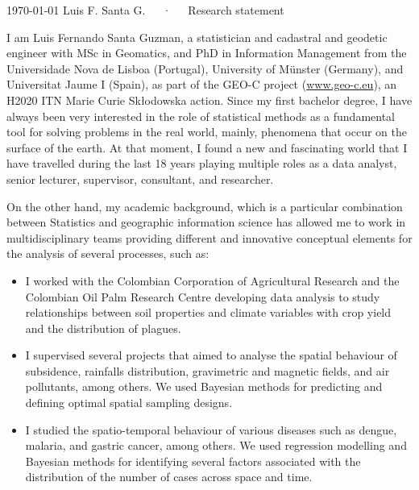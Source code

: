 \documentclass[11pt, a4paper]{awesome-cv}
\begin{document}
\makecvheader[R]

\makecvfooter
  {\today}
    {Luis F. Santa G.~~~·~~~Research statement}
  {}

\makelettertitle

\begin{cvletter}
I am Luis Fernando Santa Guzman, a statistician and cadastral and geodetic engineer with MSc in Geomatics, and PhD in Information Management from the Universidade Nova de Lisboa (Portugal), University of Münster (Germany), and Universitat Jaume I (Spain), as part of the GEO-C project (\url{www.geo-c.eu}), an H2020 ITN Marie Curie Skłodowska action. Since my first bachelor degree, I have always been very interested in the role of statistical methods as a fundamental tool for solving problems in the real world, mainly, phenomena that occur on the surface of the earth. At that moment, I found a new and fascinating world that I have travelled during the last 18 years playing multiple roles as a data analyst, senior lecturer, supervisor, consultant, and researcher.\par 
On the other hand, my academic background, which is a particular combination between Statistics and geographic information science has allowed me to work in multidisciplinary teams providing different and innovative conceptual elements for the analysis of several processes, such as:
\begin{itemize}
    \item I worked with the Colombian Corporation of Agricultural Research and the Colombian Oil Palm Research Centre developing data analysis to study relationships between soil properties and climate variables with crop yield and the distribution of plagues.
    \item I supervised several projects that aimed to analyse the spatial behaviour of subsidence, rainfalls distribution, gravimetric and magnetic fields, and air pollutants, among others. We used Bayesian methods for predicting and defining optimal spatial sampling designs.
    \item I studied the spatio-temporal behaviour of various diseases such as dengue, malaria, and gastric cancer, among others. We used regression modelling and Bayesian methods for identifying several factors associated with the distribution of the number of cases across space and time.

\end{itemize}
\end{cvletter}
\end{document}
